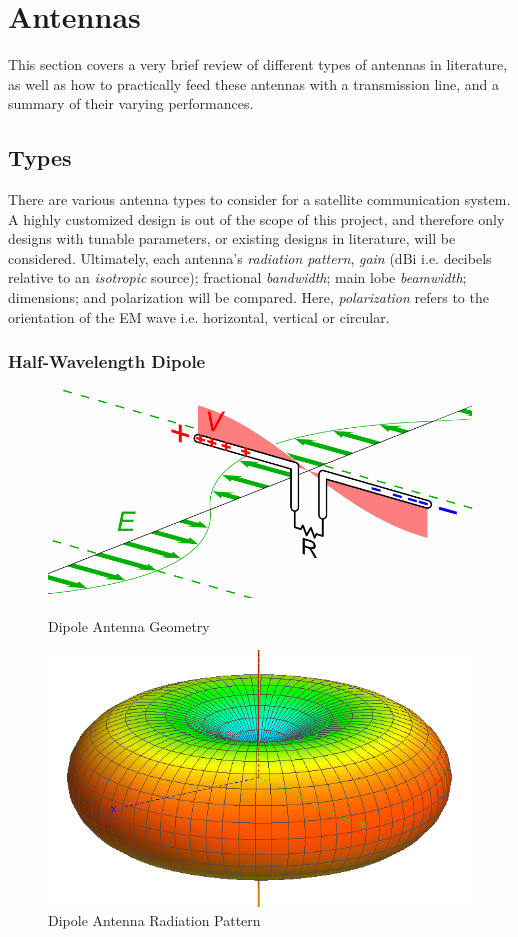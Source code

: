 \graphicspath{{./figures}}

\section{Antennas}\label{sec:antenna_theory}

This section covers a very brief review of different types of antennas in literature, as well as how to practically feed these antennas with a transmission line, and a summary of their varying performances.

\subsection{Types}\label{sec:antenna_types}
There are various antenna types to consider for a satellite communication system. A highly customized design is out of the scope of this project, and therefore only designs with tunable parameters, or existing designs in literature, will be considered. Ultimately, each antenna's \textit{radiation pattern}, \textit{gain} (dBi i.e. decibels relative to an \textit{isotropic} source); fractional \textit{bandwidth}; main lobe \textit{beamwidth}; dimensions; and polarization will be compared. Here, \textit{polarization} refers to the orientation of the EM wave i.e. horizontal, vertical or circular.

\subsubsection{Half-Wavelength Dipole}

\begin{figure}[!htb]
  \begin{minipage}{.49\textwidth}
    \centering
    \includegraphics[width=0.8\linewidth]{dipole_geometry}
    \caption{Dipole Antenna Geometry}
    \label{fig:dipole_geometry}
  \end{minipage}
  \begin{minipage}{.49\textwidth}
    \centering
    \includegraphics[width=0.6\linewidth]{dipole_pattern}
    \caption{Dipole Antenna Radiation Pattern}
    \label{fig:dipole_pattern}
  \end{minipage}
\end{figure}

